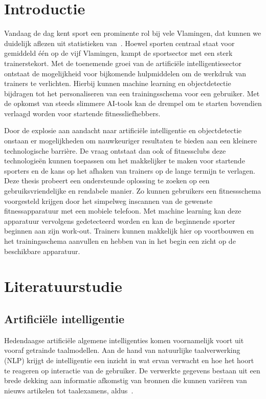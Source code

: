 
\section{Introductie}
\label{sec:introductie}
Vandaag de dag kent sport een prominente rol bij vele Vlamingen, dat kunnen we duidelijk aflezen uit statistieken van~\textcite{StatistiekVlaanderen2023}.
Hoewel sporten centraal staat voor gemiddeld \'e\'en op de vijf Vlamingen, kampt de sportsector met een sterk trainerstekort. \autocite{SportVlaanderen2023}
Met de toenemende groei van de artifici\"ele intelligentiesector ontstaat de mogelijkheid voor bijkomende hulpmiddelen om de werkdruk van trainers te verlichten.
Hierbij kunnen machine learning en objectdetectie bijdragen tot het personaliseren van een trainingsschema voor een gebruiker.
Met de opkomst van steeds slimmere AI-tools kan de drempel om te starten bovendien verlaagd worden voor startende fitnessliefhebbers.

Door de explosie aan aandacht naar artifici\"ele intelligentie en objectdetectie onstaan er mogelijkheden om nauwkeuriger resultaten te bieden aan een kleinere technologische barri\`ere.
De vraag ontstaat dan ook of fitnessclubs deze technologie\"en kunnen toepassen om het makkelijker te maken voor startende sporters en de kans op het afhaken van trainers op de lange termijn te verlagen.
Deze thesis probeert een ondersteunde oplossing te zoeken op een gebruiksvriendelijke en rendabele manier.
Zo kunnen gebruikers een fitnessschema voorgesteld krijgen door het simpelweg inscannen van de gewenste fitnessapparatuur met een mobiele telefoon.
Met machine learning kan deze apparatuur vervolgens gedetecteerd worden en kan de beginnende sporter beginnen aan zijn work-out.
Trainers kunnen makkelijk hier op voortbouwen en het trainingsschema aanvullen en hebben van in het begin een zicht op de beschikbare apparatuur.


\section{Literatuurstudie}
\label{sec:state-of-the-art}

\subsection{Artificiële intelligentie}
\label{subsec:artificiele-intelligentie}
Hedendaagse artifici\"ele algemene intelligenties komen voornamelijk voort uit vooraf getrainde taalmodellen.
Aan de hand van natuurlijke taalverwerking (NLP) krijgt de intelligentie een inzicht in wat ervan verwacht en hoe het hoort te reageren op interactie van de gebruiker.
De verwerkte gegevens bestaan uit een brede dekking aan informatie afkomstig van bronnen die kunnen vari\"eren van nieuws artikelen tot taalexamens, aldus~\textcite{Liu2019}.

